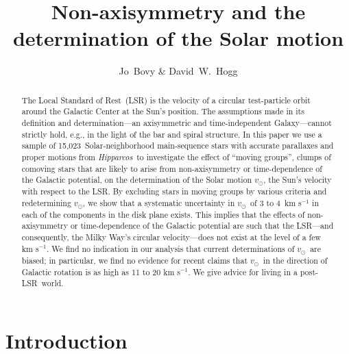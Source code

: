 \documentclass[12pt,preprint]{aastex}
\newcounter{address}
\newcommand{\eg}{e.g.}
\newcommand{\Hipparcos}{\textsl{Hipparcos}}
\newcommand{\vsunlsr}{\ensuremath{v_\odot}}
\newcommand{\lsr}{Local Standard of Rest}
\newcommand{\lsrabb}{LSR}
\newcommand{\resultrange}{3 to 4}
\newcommand{\nstars}{15,023}
\begin{document}
\title{Non-axisymmetry and the determination of the Solar motion
}
\author{
Jo~Bovy\altaffilmark{\ref{NYU},\ref{email}} \&
David~W.~Hogg\altaffilmark{\ref{NYU},\ref{MPIA}}
}

\begin{abstract}
The \lsr\ (\lsrabb) is the velocity of a circular test-particle orbit
around the Galactic Center at the Sun's position. The assumptions made
in its definition and determination---an axisymmetric and
time-independent Galaxy---cannot strictly hold, \eg, in the light of
the bar and spiral structure. In this paper we use a sample of
\nstars\ Solar-neighborhood main-sequence stars with accurate
parallaxes and proper motions from \Hipparcos\ to investigate the
effect of ``moving groups'', clumps of comoving stars that are likely
to arise from non-axisymmetry or time-dependence of the Galactic
potential, on the determination of the Solar motion \vsunlsr, the
Sun's velocity with respect to the \lsrabb. By excluding stars in
moving groups by various criteria and redetermining \vsunlsr, we show
that a systematic uncertainty in \vsunlsr\ of \resultrange\ km
s$^{-1}$ in each of the components in the disk plane exists. This
implies that the effects of non-axisymmetry or time-dependence of the
Galactic potential are such that the \lsrabb---and consequently, the
Milky Way's circular velocity---does not exist at the level of a few
km s$^{-1}$. We find no indication in our analysis that current
determinations of \vsunlsr\ are biased; in particular, we find no
evidence for recent claims that \vsunlsr\ in the direction of Galactic
rotation is as high as 11 to 20 km s$^{-1}$. We give advice for living
in a post-\lsrabb\ world.
\end{abstract}


\section{Introduction}
\end{document}
